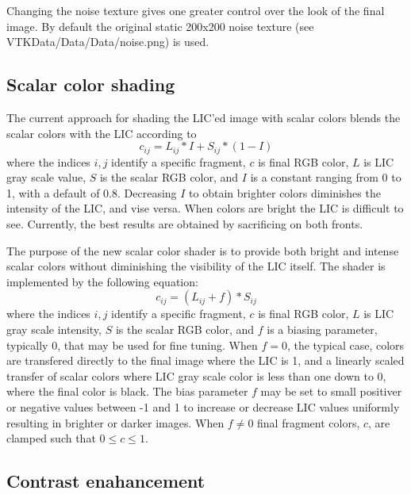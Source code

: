 \documentclass[a4paper,10pt]{article}
\begin{document}
Changing the noise texture gives one greater control over the look of the final image. By default the original static 200x200 noise texture (see VTKData/Data/Data/noise.png) is used.

\subsection{Scalar color shading}
The current approach for shading the LIC'ed image with scalar colors blends the scalar colors with the LIC according to
\begin{equation}
c_{ij} = L_{ij} * I + S_{ij} * (1 - I)
\label{eqn:color-blend}
\end{equation}
where the indices $i,j$ identify a specific fragment, $c$ is final RGB color, $L$ is LIC gray scale value, $S$ is the scalar RGB color, and $I$ is a constant ranging from 0 to 1, with a default of 0.8. Decreasing $I$ to obtain brighter colors diminishes the intensity of the LIC, and vise versa. When colors are bright the LIC is difficult to see. Currently, the best results are obtained by sacrificing on both fronts.

The purpose of the new scalar color shader is to provide both bright and intense scalar colors without diminishing the visibility of the LIC itself. The shader is implemented by the following equation:
\begin{equation}
c_{ij} = ( L_{ij} + f ) * S_{ij}
\label{eqn:color-map}
\end{equation}
where the indices $i,j$ identify a specific fragment, $c$ is final RGB color, $L$ is LIC gray scale intensity, $S$ is the scalar RGB color, and $f$ is a biasing parameter, typically 0, that may be used for fine tuning. When $f=0$, the typical case, colors are transfered directly to the final image where the LIC is 1, and a linearly scaled transfer of scalar colors where LIC gray scale color is less than one down to 0, where the final color is black. The bias parameter $f$ may be set to small positiver or negative values between -1 and 1 to increase or decrease LIC values uniformly resulting in brighter or darker images. When $f\neq0$ final fragment colors, $c$, are clamped such that $0 \leq c \leq 1$.

\subsection{Contrast enahancement}
\end{document}
